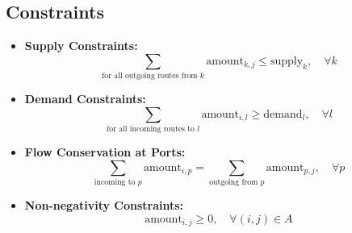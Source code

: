 \documentclass{article}
\begin{document}
\subsection*{Constraints}
\begin{itemize}
    \item \textbf{Supply Constraints:} 
    \[
    \sum_{\text{for all outgoing routes from } k} \text{amount}_{k,j} \leq \text{supply}_k, \quad \forall k
    \]
    
    \item \textbf{Demand Constraints:}
    \[
    \sum_{\text{for all incoming routes to } l} \text{amount}_{i,l} \geq \text{demand}_l, \quad \forall l
    \]
    
    \item \textbf{Flow Conservation at Ports:}
    \[
    \sum_{\text{incoming to } p} \text{amount}_{i,p} = \sum_{\text{outgoing from } p} \text{amount}_{p,j}, \quad \forall p
    \]

    \item \textbf{Non-negativity Constraints:}
    \[
    \text{amount}_{i,j} \geq 0, \quad \forall (i,j) \in A
    \]
\end{itemize}
\end{document}
